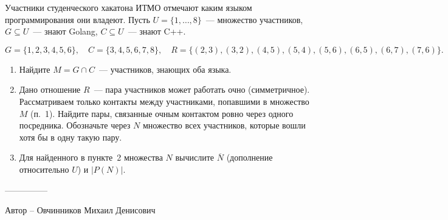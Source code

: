 \question
Участники студенческого хакатона ИТМО отмечают каким языком
программирования они владеют. Пусть $U = \{1, \ldots, 8\}$~---
множество участников, $G \subseteq U$~--- знают Golang,
$C \subseteq U$~--- знают C++.

\[
    G = \{1, 2, 3, 4, 5, 6\}, \quad
    C = \{3, 4, 5, 6, 7, 8\}, \quad
    R = \{(2, 3), (3, 2), (4, 5), (5, 4), (5, 6), (6, 5), (6, 7), (7, 6)\}.
\]

\begin{enumerate}
    \renewcommand{\labelenumi}{\arabic{enumi}.}
    \item Найдите $M = G \cap C$~--- участников, знающих оба языка.

    \item Дано отношение $R$~--- пара участников может работать очно
    (симметричное). Рассматриваем только контакты между участниками,
    попавшими в множество $M$ (п.~1). Найдите пары, связанные очным
    контактом ровно через одного посредника. Обозначьте через $N$
    множество всех участников, которые вошли хотя бы в одну такую пару.

    \item Для найденного в пункте~2 множества $N$ вычислите
    $\overline{N}$ (дополнение относительно $U$) и $|P(N)|$.
\end{enumerate}

---------------

Автор -- Овчинников Михаил Денисович
